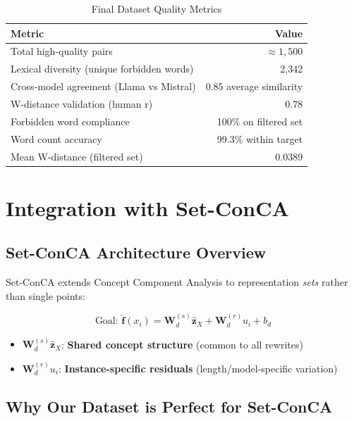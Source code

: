 \documentclass[12pt,a4paper]{report}
\begin{document}
\begin{table}[H]
\centering
\begin{tabular}{lr}
\toprule
\textbf{Metric} & \textbf{Value} \\
\midrule
Total high-quality pairs & $\approx 1,500$ \\
Lexical diversity (unique forbidden words) & 2,342 \\
Cross-model agreement (Llama vs Mistral) & 0.85 average similarity \\
W-distance validation (human r) & 0.78 \\
Forbidden word compliance & 100\% on filtered set \\
Word count accuracy & 99.3\% within target \\
Mean W-distance (filtered set) & 0.0389 \\
\bottomrule
\end{tabular}
\caption{Final Dataset Quality Metrics}
\end{table}

\newpage

\chapter{Integration with Set-ConCA}

\section{Set-ConCA Architecture Overview}

Set-ConCA extends Concept Component Analysis to representation \textit{sets} rather than single points:

$$\text{Goal: } \hat{\mathbf{f}}(x_i) = \mathbf{W}^{(s)}_d \hat{\mathbf{z}}_X + \mathbf{W}^{(r)}_d u_i + b_d$$

\begin{itemize}
    \item $\mathbf{W}^{(s)}_d \hat{\mathbf{z}}_X$: \textbf{Shared concept structure} (common to all rewrites)
    \item $\mathbf{W}^{(r)}_d u_i$: \textbf{Instance-specific residuals} (length/model-specific variation)
\end{itemize}

\section{Why Our Dataset is Perfect for Set-ConCA}
\end{document}

